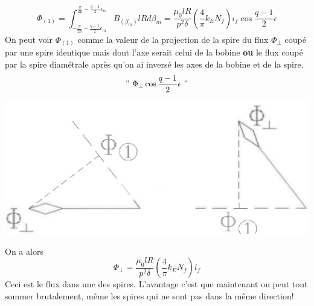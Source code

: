 	\begin{equation}
	\Phi_{(1)} = \int_{-\frac{\pi}{2p}-\frac{q-1}{2}\epsilon_m}^{\frac{\pi}{2p}-
	\frac{q-1}{2}\epsilon_m} B_{(\beta_m)} lRd\beta_m = \dfrac{\mu_0lR}{p^2\delta}
	\left(\dfrac{4}{\pi}k_EN_f\right)i_f\cos\dfrac{q-1}{2}\epsilon
	\end{equation}
	On peut voir $\Phi_{(1)}$ comme la valeur de la projection de la spire du flux
	$\Phi_\perp$ coupé par une spire identique mais dont l'axe serait celui de la 
	bobine \textbf{ou} le flux coupé par la spire diamétrale après qu'on ai 
	inversé les axes de la bobine et de la spire.
	\begin{equation}
	"\ \Phi_\perp \cos\dfrac{q-1}{2}\epsilon\ "
	\end{equation}
	
	\begin{center}
	\includegraphics[scale=0.45]{ch5/image13.png}
	\end{center}
	On a alors
	\begin{equation}
	\Phi_\perp = \dfrac{\mu_0lR}{p^2\delta}\left(\dfrac{4}{\pi}k_EN_f\right)i_f
	\end{equation}
	Ceci est le flux dans une des spires. L'avantage c'est que maintenant on peut 
	tout sommer brutalement, même les spires qui ne sont pas dans la même direction!\\
	
